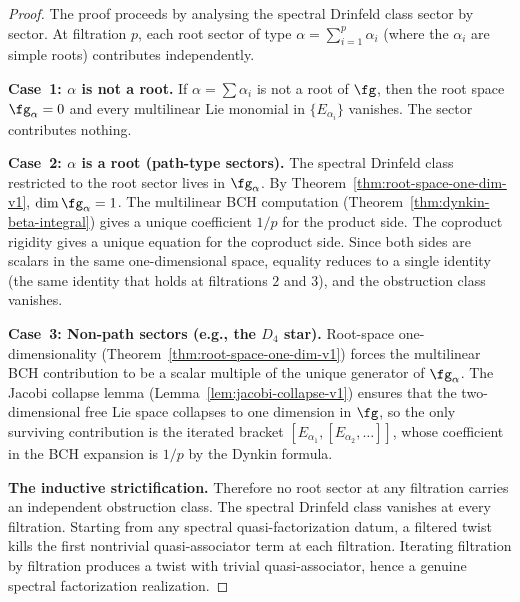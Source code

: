 \begin{proof}
The proof proceeds by analysing the spectral Drinfeld class sector by
sector. At filtration $p$, each root sector of type
$\alpha=\sum_{i=1}^p\alpha_i$ (where the $\alpha_i$ are simple roots)
contributes independently.

\medskip\noindent\textbf{Case~1: $\alpha$ is not a root.}
If $\alpha=\sum\alpha_i$ is not a root of $\fg$, then the root space
$\fg_\alpha=0$ and every multilinear Lie monomial in
$\{E_{\alpha_i}\}$ vanishes. The sector contributes nothing.

\medskip\noindent\textbf{Case~2: $\alpha$ is a root (path-type
sectors).}
The spectral Drinfeld class restricted to the root sector lives in
$\fg_\alpha$. By Theorem~\ref{thm:root-space-one-dim-v1},
$\dim\fg_\alpha=1$. The multilinear BCH computation
(Theorem~\ref{thm:dynkin-beta-integral}) gives a unique coefficient
$1/p$ for the product side. The coproduct rigidity gives a unique
equation for the coproduct side. Since both sides are scalars in the
same one-dimensional space, equality reduces to a single identity
(the same identity that holds at filtrations $2$ and $3$), and the
obstruction class vanishes.

\medskip\noindent\textbf{Case~3: Non-path sectors (e.g., the $D_4$
star).}
Root-space one-dimensionality
(Theorem~\ref{thm:root-space-one-dim-v1}) forces the multilinear
BCH contribution to be a scalar multiple of the unique generator of
$\fg_\alpha$. The Jacobi collapse lemma
(Lemma~\ref{lem:jacobi-collapse-v1}) ensures that the
two-dimensional free Lie space collapses to one dimension in
$\fg$, so the only surviving contribution is the iterated bracket
$[E_{\alpha_1},[E_{\alpha_2},\ldots]]$, whose coefficient in the
BCH expansion is $1/p$ by the Dynkin formula.

\medskip\noindent\textbf{The inductive strictification.}
Therefore no root sector at any filtration carries an independent
obstruction class. The spectral Drinfeld class vanishes at every
filtration. Starting from any spectral quasi-factorization datum, a
filtered twist kills the first nontrivial quasi-associator term at
each filtration. Iterating filtration by filtration produces a twist
with trivial quasi-associator, hence a genuine spectral factorization
realization.
\end{proof}

